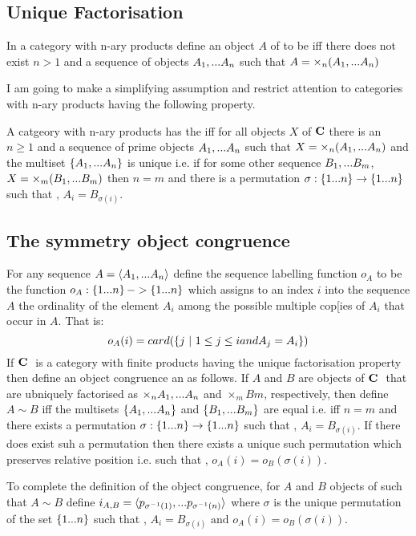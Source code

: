 \documentclass[10pt,a4paper]{scrartcl}
\begin{document}
\subsection{Unique Factorisation}
\begin{definition}
In a category with n-ary products \catc define an object $A$ of \catc to be  iff there does not exist $n > 1$ and a sequence of objects $A_1,...A_n$ 
such that $A=\times_n(A_1,...A_n)$
\end{definition}
I am going to make a simplifying assumption and restrict attention to categories with n-ary products having the following property.
\begin{definition}
A catgeory with n-ary products has the  iff for all objects $X$ of $\textbf{C}$
there is an $n \geq 1$ and a sequence of prime objects $A_1,...A_n$ such that $X=\times_n(A_1,...A_n)$ and the multiset $\left\{A_1,...A_n\right\}$
is unique i.e. if for some other sequence $B_1,...B_m$, $X=\times_m(B_1,...B_m)$ then $n=m$ and there is a permutation $\sigma:\left\{1...n\right\} \rightarrow \left\{1...n\right\}$ such that \foreachi,
$A_i=B_{\sigma(i)}$.
\end{definition}

\subsection{The symmetry object congruence}
For any sequence $A=\langle A_1,...A_n\rangle$ define the sequence labelling function $o_A$ to be the function $o_A : \left\{1...n\right\} -> \left\{1...n\right\}$ which assigns to an index $i$ into the sequence $A$ the
ordinality of the element $A_i$ among the possible multiple cop[ies of $A_i$ that occur in $A$. That is:
$$
o_A(i) = card(\left\{j \ \middle|\ 1 \leq j \leq i and A_j=A_i\right\})
$$
If $\textbf{C}\ $ is a category with finite products having the unique factorisation property then define an object congruence an \catcw as follows.
If $A$ and $B$ are objects of $\textbf{C}\ $ that are ubniquely factorised as $\times_n{A_1,...A_n}$ and $\times_m{Bm}$, respectively, then define
$A \sim B$ iff the multisets $\left\{A_1,...A_n\right\}$ and $\left\{B_1,...B_m\right\}$ are equal i.e. iff $n=m$ and there exists a permutation $\sigma: \left\{1...n\right\} \rightarrow \left\{1...n\right\}$ such that \foreachi, $A_i=B_{\sigma(i)}$. 
If there does exist suh a permutation then there exists a unique such permutation which preserves relative position i.e. such that \foreachi, $o_A(i)=o_B(\sigma(i))$. 

To complete the definition of the object congruence, 
for $A$ and $B$ objects of \catcw such that $A\sim B$ define $i_{A,B}=\langle p_{\sigma^{-1}(1)},...p_{\sigma^{-1}(n)}\rangle$ where $\sigma$ is the unique permutation of the set $\left\{1...n\right\}$
such that \foreachi, $A_i=B_{\sigma(i)} \mbox{ and }  o_A(i) = o_B(\sigma(i))$.  
\end{document}
